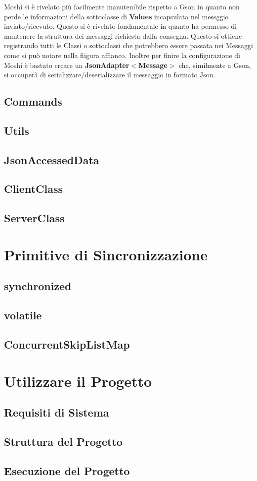 \documentclass{article}
\begin{document}
Moshi si è rivelato più facilmente manutenibile rispetto a Gson in quanto non perde le informazioni della sottoclasse di \textbf{Values} incapsulata nel messggio inviato/ricevuto. Questo si è rivelato fondamentale in quanto ha permesso di mantenere la struttura dei messaggi richiesta dalla consegna. Questo si ottiene registrando tutti le Classi o sottoclassi che potrebbero essere passata nei Messaggi come si può notare nella fiigura affianco.
Inoltre per finire la configurazione di Moshi è bastato creare un \textbf{JsonAdapter$<$Message$>$} che, similmente a Gson, si occuperà di serializzare/deserializzare il messaggio in formato Json.

\subsection{Commands}

\subsection{Utils}

\subsection{JsonAccessedData}

\subsection{ClientClass}

\subsection{ServerClass}

\section{Primitive di Sincronizzazione}

\subsection{synchronized}

\subsection{volatile}
\subsection{ConcurrentSkipListMap}

\section{Utilizzare il Progetto}

\subsection{Requisiti di Sistema}

\subsection{Struttura del Progetto}

\subsection{Esecuzione del Progetto}
\end{document}

